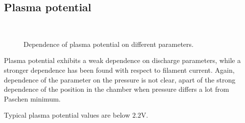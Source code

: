 \documentclass[11pt,a4 paper]{article}
\begin{document}
\subsection{Plasma potential}
\begin{figure}[H]
\\%
 \caption{Dependence of plasma potential on different parameters.}\label{fig:n}%
\end{figure}
Plasma potential exhibits a weak dependence on discharge parameters, while a stronger dependence has been found with respect to filament current. Again, dependence of the parameter on the pressure is not clear, apart of the strong dependence of the position in the chamber when pressure differs a lot from Paschen minimum.

Typical plasma potential values are below $2.2\si\volt$.
\end{document}

